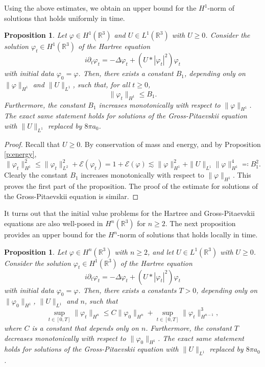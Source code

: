 \documentclass[11pt,a4paper,draft,DIV11]{scrartcl}	%
\newtheorem{prp}[thm]{Proposition}
\newcommand{\R}{\mathds{R}}
\newcommand{\norm}[1]{\lVert#1\rVert}	%
\begin{document}
Using the above estimates, we obtain an upper bound for the $H^1$-norm of
solutions that holds uniformly in time.


\begin{prp} \label{p:reg1}
  Let $\varphi \in H^1(\R^3)$ and $U \in L^1(\R^3)$ with $U \ge 0$. Consider
  the solution $\varphi_t \in H^1(\R^3)$ of the Hartree equation
  \[
    i \partial_t \varphi_t = - \Delta \varphi_t + (U * |\varphi_t|^2)
    \varphi_t
  \]
  with initial data $\varphi_0 = \varphi$. Then, there exists a constant
  $B_1$, depending only on $\| \varphi \|_{H^1}$ and $\| U \|_{L^1}$, such
  that, for all $t \geq 0$,
  \[
    \norm{\varphi_t}_{H^1} \leq B_1. 
  \]
  Furthermore, the constant $B_1$ increases monotonically with respect to
  $\| \varphi \|_{H^1}$. The exact same statement holds for solutions of the
  Gross-Pitaevskii equation with $\| U \|_{L^1}$ replaced by $8 \pi a_0$.
\end{prp}


\begin{proof}
  Recall that $U \ge 0$. By conservation of mass and energy, and by
  Proposition \ref{p:energy},
  \[
    \| \varphi_t \|_{H^1}^2 \le \| \varphi_t \|_{L^2}^2 +
    \mathcal{E}(\varphi_t) = 1 + \mathcal{E}(\varphi) \apprle \| \varphi
    \|_{H^1}^2 + \| U \|_{L^1} \| \varphi \|_{H^1}^4 \eqqcolon B_1^2.
  \]
  Clearly the constant $B_1$ increases monotonically with respect to $\|
  \varphi \|_{H^1}$. This proves the first part of the proposition. The
  proof of the estimate for solutions of the Gross-Pitaevskii equation is
  similar.
\end{proof}


It turns out that the initial value problems for the Hartree and
Gross-Pitaevskii equations are also well-posed in $H^n(\R^3)$ for $n \ge 2$.
The next proposition provides an upper bound for the $H^n$-norm of solutions
that holds locally in time.


\begin{prp} \label{p:lregn}
  Let $\varphi \in H^n(\R^3)$ with $n \geq 2$, and let $U \in L^1(\R^3)$
  with $U \ge 0$. Consider the solution $\varphi_t \in H^1(\R^3)$ of the
  Hartree equation
  \[
    i \partial_t \varphi_t = - \Delta \varphi_t + (U * |\varphi_t|^2)
    \varphi_t
  \]
  with initial data $\varphi_0 = \varphi$. Then, there exists a constants $T
  > 0$, depending only on $\| \varphi_0 \|_{H^1}$, $\| U \|_{L^1}$ and $n$,
  such that
  \begin{equation}\label{eq:preregularity}
    \sup_{t \in [0,T]} \| \varphi_t \|_{H^n} \le C \| \varphi_0 \|_{H^n} +
    \sup_{t \in [0,T]} \| \varphi_t \|_{H^{n-1}}^3,
  \end{equation}
  where $C$ is a constant that depends only on $n$. Furthermore, the
  constant $T$ decreases monotonically with respect to $\| \varphi_0
  \|_{H^1}$. The exact same statement holds for solutions of the
  Gross-Pitaevskii equation with $\| U \|_{L^1}$ replaced by $8 \pi a_0$.
\end{prp}
\end{document}
